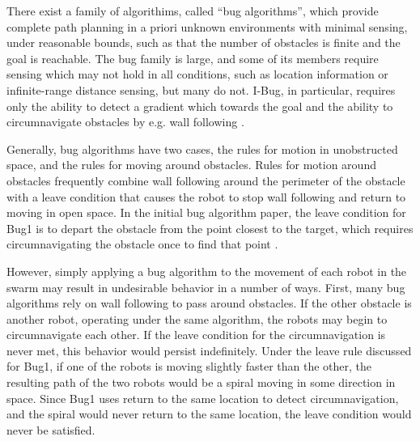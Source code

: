 There exist a family of algorithims, called ``bug algorithms'', which provide complete path planning in a priori unknown environments with minimal sensing, under reasonable bounds, such as that the number of obstacles is finite and the goal is reachable. The bug family is large, and some of its members require sensing which may not hold in all conditions, such as location information or infinite-range distance sensing, but many do not. I-Bug, in particular, requires only the ability to detect a gradient which towards the goal and the ability to circumnavigate obstacles by e.g. wall following \citep{taylor2009bug}.

Generally, bug algorithms have two cases, the rules for motion in unobstructed space, and the rules for moving around obstacles. 
Rules for motion around obstacles frequently combine wall following around the perimeter of the obstacle with a leave condition that causes the robot to stop wall following and return to moving in open space. 
In the initial bug algorithm paper, the leave condition for Bug1 is to depart the obstacle from the point closest to the target, which requires circumnavigating the obstacle once to find that point \citep{lumelsky1987path}.

However, simply applying a bug algorithm to the movement of each robot in the swarm may result in undesirable behavior in a number of ways. 
First, many bug algorithms rely on wall following to pass around obstacles. 
If the other obstacle is another robot, operating under the same algorithm, the robots may begin to circumnavigate each other. 
If the leave condition for the circumnavigation is never met, this behavior would persist indefinitely. 
Under the leave rule discussed for Bug1, if one of the robots is moving slightly faster than the other, the resulting path of the two robots would be a spiral moving in some direction in space. 
Since Bug1 uses return to the same location to detect circumnavigation, and the spiral would never return to the same location, the leave condition would never be satisfied.

